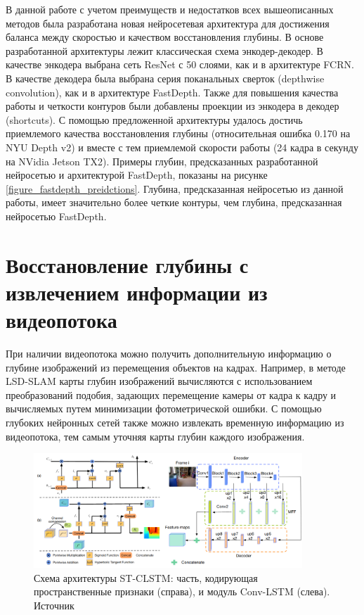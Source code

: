 \documentclass{mipt-thesis-ms}
\begin{document}
	В данной работе с учетом преимуществ и недостатков всех вышеописанных методов была разработана новая нейросетевая архитектура для достижения баланса между скоростью и качеством восстановления глубины. В основе разработанной архитектуры лежит классическая схема энкодер-декодер. В качестве энкодера выбрана сеть ResNet с 50 слоями, как и в архитектуре FCRN. В качестве декодера была выбрана серия поканальных сверток (depthwise convolution), как и в архитектуре FastDepth. Также для повышения качества работы и четкости контуров были добавлены проекции из энкодера в декодер (shortcuts). С помощью предложенной архитектуры удалось достичь приемлемого качества восстановления глубины (относительная ошибка 0.170 на NYU Depth v2) и вместе с тем приемлемой скорости работы (24 кадра в секунду на NVidia Jetson TX2). Примеры глубин, предсказанных разработанной нейросетью и архитектурой FastDepth, показаны на рисунке \ref{figure_fastdepth_preidctions}. Глубина, предсказанная нейросетью из данной работы, имеет значительно более четкие контуры, чем глубина, предсказанная нейросетью FastDepth.
	
	\section{Восстановление глубины с извлечением информации из видеопотока}
	
	При наличии видеопотока можно получить дополнительную информацию о глубине изображений из перемещения объектов на кадрах. Например, в методе LSD-SLAM \cite{engel2014lsd} карты глубин изображений вычисляются с использованием преобразований подобия, задающих перемещение камеры от кадра к кадру и вычисляемых путем минимизации фотометрической ошибки. С помощью глубоких нейронных сетей также можно извлекать временную информацию из видеопотока, тем самым уточняя карты глубин каждого изображения.
	
	\begin{figure}
		\centering
		\includegraphics[width=0.9\textwidth]{img/st_clstm_scheme.png}
		\caption{Схема архитектуры ST-CLSTM: часть, кодирующая пространственные признаки (справа), и модуль Conv-LSTM (слева). Источник \cite{zhang2019exploiting}}
		\label{figure_conv_lstm}
	\end{figure}
	
\end{document}
